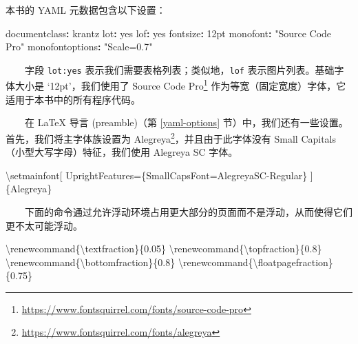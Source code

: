 \documentclass[
  12pt,
]{krantz}
\newenvironment{Shaded}{\begin{snugshade}}{\end{snugshade}}
\newcommand{\AttributeTok}[1]{\textcolor[rgb]{0.77,0.63,0.00}{#1}}
\newcommand{\CharTok}[1]{\textcolor[rgb]{0.31,0.60,0.02}{#1}}
\newcommand{\ExtensionTok}[1]{#1}
\newcommand{\FunctionTok}[1]{\textcolor[rgb]{0.00,0.00,0.00}{#1}}
\newcommand{\KeywordTok}[1]{\textcolor[rgb]{0.13,0.29,0.53}{\textbf{#1}}}
\newcommand{\NormalTok}[1]{#1}
\newcommand{\StringTok}[1]{\textcolor[rgb]{0.31,0.60,0.02}{#1}}
\renewcommand{\href}[2]{#2\footnote{\url{#1}}}
\theoremstyle{definition}
\theoremstyle{definition}
\theoremstyle{definition}
\theoremstyle{definition}
\theoremstyle{remark}
\begin{document}
本书的 YAML 元数据包含以下设置：

\begin{Shaded}
\begin{Highlighting}[]
\FunctionTok{documentclass}\KeywordTok{:}\AttributeTok{ krantz}
\FunctionTok{lot}\KeywordTok{:}\AttributeTok{ }\CharTok{yes}
\FunctionTok{lof}\KeywordTok{:}\AttributeTok{ }\CharTok{yes}
\FunctionTok{fontsize}\KeywordTok{:}\AttributeTok{ 12pt}
\FunctionTok{monofont}\KeywordTok{:}\AttributeTok{ }\StringTok{"Source Code Pro"}
\FunctionTok{monofontoptions}\KeywordTok{:}\AttributeTok{ }\StringTok{"Scale=0.7"}
\end{Highlighting}
\end{Shaded}

  字段 \texttt{lot:yes} 表示我们需要表格列表；类似地，\texttt{lof} 表示图片列表。基础字体大小是 `12pt'，我们使用了 \href{https://www.fontsquirrel.com/fonts/source-code-pro}{Source Code Pro} 作为等宽（固定宽度）字体，它适用于本书中的所有程序代码。

  在 LaTeX 导言 (preamble)（第 \ref{yaml-options} 节）中，我们还有一些设置。首先，我们将主字体族设置为 \href{https://www.fontsquirrel.com/fonts/alegreya}{Alegreya}，并且由于此字体没有 {Small Capitals}（小型大写字母）特征，我们使用 Alegreya SC 字体。

\begin{Shaded}
\begin{Highlighting}[]
\FunctionTok{\textbackslash{}setmainfont}\NormalTok{[}
\NormalTok{  UprightFeatures=\{SmallCapsFont=AlegreyaSC{-}Regular\}}
\NormalTok{]\{Alegreya\}}
\end{Highlighting}
\end{Shaded}

  下面的命令通过允许浮动环境占用更大部分的页面而不是浮动，从而使得它们更不太可能浮动。

\begin{Shaded}
\begin{Highlighting}[]
\FunctionTok{\textbackslash{}renewcommand}\NormalTok{\{}\ExtensionTok{\textbackslash{}textfraction}\NormalTok{\}\{0.05\}}
\FunctionTok{\textbackslash{}renewcommand}\NormalTok{\{}\ExtensionTok{\textbackslash{}topfraction}\NormalTok{\}\{0.8\}}
\FunctionTok{\textbackslash{}renewcommand}\NormalTok{\{}\ExtensionTok{\textbackslash{}bottomfraction}\NormalTok{\}\{0.8\}}
\FunctionTok{\textbackslash{}renewcommand}\NormalTok{\{}\ExtensionTok{\textbackslash{}floatpagefraction}\NormalTok{\}\{0.75\}}
\end{Highlighting}
\end{Shaded}
\end{document}
